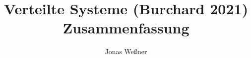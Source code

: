 \documentclass{article}
\begin{document}
\title{Verteilte Systeme (Burchard 2021) Zusammenfassung}
\author{Jonas Weßner}
\maketitle
\tableofcontents
\newpage				%











\end{document}
